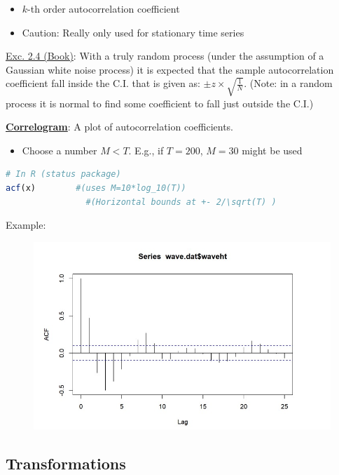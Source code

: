 \begin{itemize}
    \item $k$-th order autocorrelation coefficient
    \item Caution: Really only used for stationary time series
\end{itemize}

\underline{Exc. 2.4 (Book)}: \quad With a truly random process (under the assumption of a Gaussian white noise process) it is expected that the sample autocorrelation coefficient fall inside the C.I. that is given as: $\pm z\times \sqrt{\frac{1}{N}}$. (Note: in a random process it is normal to find some coefficient to fall just outside the C.I.)


\textbf{\underline{Correlogram}}: \quad A plot of autocorrelation coefficients.

\begin{itemize}
    \item Choose a number $M<T$. E.g., if $T=200$, $M=30$ might be used
\end{itemize}

\begin{lstlisting}[language=R]
# In R (status package)
acf(x)        #(uses M=10*log_10(T))
                #(Horizontal bounds at +- 2/\sqrt(T) )
\end{lstlisting}

Example:

\begin{figure}[h]
\includegraphics[scale=0.4]{images/Screenshot 2024-03-30 at 17.42.36.jpg}
\centering
\end{figure}


\subsection{Transformations}

